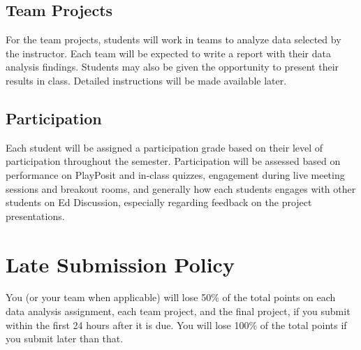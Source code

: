\documentclass[11pt, a4paper]{article}
\begin{document}
\subsection{Team Projects}
For the team projects, students will work in teams to analyze data selected by the instructor. Each team will be expected to write a report with their data analysis findings. Students may also be given the opportunity to present their results in class. Detailed instructions will be made available later.

\subsection{Participation}
Each student will be assigned a participation grade based on their level of participation throughout the semester. Participation will be assessed based on performance on  PlayPosit and in-class quizzes, engagement during live meeting sessions and breakout rooms, and generally how each students engages with other students on Ed Discussion, especially regarding feedback on the project presentations.


\section{Late Submission Policy} 
You (or your team when applicable) will lose 50\% of the total points on each data analysis assignment, each team project, and the final project, if you submit within the first 24 hours after it is due. You will lose 100\% of the total points if you submit later than that.
\end{document}

